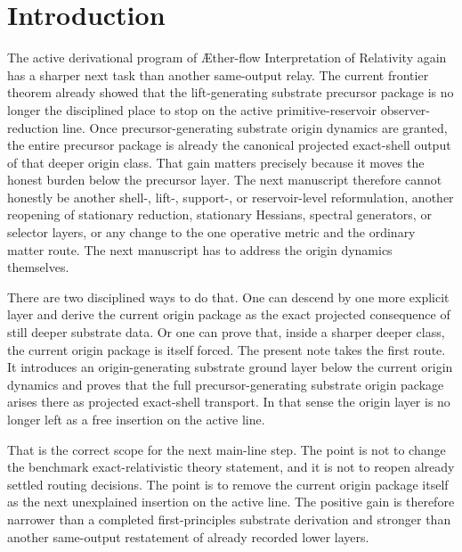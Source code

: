 \documentclass[11pt]{article}
\newcommand{\Aflow}{\AE{}ther-flow}
\newcommand{\TheoryName}{\Aflow{} Interpretation of Relativity}
\begin{document}
\section{Introduction}

The active derivational program of \TheoryName{} again has a sharper next task than another same-output relay. The current frontier theorem already showed that the lift-generating substrate precursor package is no longer the disciplined place to stop on the active primitive-reservoir observer-reduction line. Once precursor-generating substrate origin dynamics are granted, the entire precursor package is already the canonical projected exact-shell output of that deeper origin class. That gain matters precisely because it moves the honest burden below the precursor layer. The next manuscript therefore cannot honestly be another shell-, lift-, support-, or reservoir-level reformulation, another reopening of stationary reduction, stationary Hessians, spectral generators, or selector layers, or any change to the one operative metric and the ordinary matter route. The next manuscript has to address the origin dynamics themselves.

There are two disciplined ways to do that. One can descend by one more explicit layer and derive the current origin package as the exact projected consequence of still deeper substrate data. Or one can prove that, inside a sharper deeper class, the current origin package is itself forced. The present note takes the first route. It introduces an origin-generating substrate ground layer below the current origin dynamics and proves that the full precursor-generating substrate origin package arises there as projected exact-shell transport. In that sense the origin layer is no longer left as a free insertion on the active line.

That is the correct scope for the next main-line step. The point is not to change the benchmark exact-relativistic theory statement, and it is not to reopen already settled routing decisions. The point is to remove the current origin package itself as the next unexplained insertion on the active line. The positive gain is therefore narrower than a completed first-principles substrate derivation and stronger than another same-output restatement of already recorded lower layers.
\end{document}
